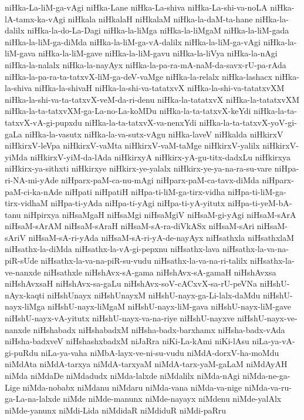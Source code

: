 {niHka-La-liM-ga-vAgi
niHka-Lane
niHka-La-shiva
niHka-La-shi-va-noLA
niHka-lA-tamx-ka-vAgi
niHkala
niHkalaH
niHkalaM
niHka-la-daM-ta-hane
niHka-la-dalilx
niHka-la-do-La-Dagi
niHka-la-liMga
niHka-la-liMgaM
niHka-la-liM-gada
niHka-la-liM-ga-diMda
niHka-la-liM-ga-vA-dalilx
niHka-la-liM-ga-vAgi
niHka-la-liM-gava
niHka-la-liM-gave
niHka-la-liM-gavu
niHka-la-liVya
niHka-la-nAgi
niHka-la-nalalx
niHka-la-nayAyx
niHka-la-pa-ra-mA-naM-da-savx-rU-pa-rAda
niHka-la-pa-ra-ta-tatxvX-liM-ga-deV-vaMge
niHka-la-relalx
niHka-lashacx
niHka-la-shiva
niHka-la-shivaH
niHka-la-shi-va-tatatxvX
niHka-la-shi-va-tatatxvXM
niHka-la-shi-va-ta-tatxvX-veM-da-ri-denu
niHka-la-tatatxvX
niHka-la-tatatxvXM
niHka-la-ta-tatxvXM-ga-La-no-La-koMDu
niHka-la-ta-tatxvX-keYdi
niHka-la-ta-tatxvX-vA-gi-pupxdu
niHka-la-ta-tatxvX-va-nenxYdi
niHka-la-ta-tatxvX-yoV-gi-gaLa
niHka-la-vasutx
niHka-la-va-sutx-vAgu
niHka-laveV
niHkalda
niHkirxV
niHkirxV-leVpa
niHkirxV-vaMta
niHkirxV-vaM-taMge
niHkirxV-yalilx
niHkirxV-yiMda
niHkirxV-yiM-da-lAda
niHkirxyA
niHkirx-yA-gu-titx-dadxLu
niHkirxya
niHkirx-ya-sithxti
niHkirxye
niHkirx-ye-yalalx
niHkirx-ye-ya-na-ra-su-vare
niHpa-ri-NA-mi-yAde
niHparx-paM-ca-nu-mAgi
niHparx-paM-ca-tavx-diMda
niHparx-paM-ci-ka-nAde
niHpati
niHpatiH
niHpa-ti-liM-ga-tirx-vidha
niHpa-ti-liM-ga-tirx-vidhaM
niHpa-ti-yAda
niHpa-ti-yAgi
niHpa-ti-yA-yitutx
niHpa-ti-yeM-bA-tanu
niHpirxya
niHsaMgaH
niHsaMgi
niHsaMgiV
niHsaM-gi-yAgi
niHsaM-sArA
niHsaM-sArAM
niHsaM-sAraH
niHsaM-sA-ra-diVkASx
niHsaM-sAri
niHsaM-sAriV
niHsaM-sA-ri-yAda
niHsaM-sA-ri-yA-de-nayAyx
niHsathxla
niHsathxlaM
niHsathx-la-diMda
niHsathx-la-vA-gi-pepxnu
niHsathx-lava
niHsathx-la-va-na-piR-sUde
niHsathx-la-va-na-piR-su-vudu
niHsathx-la-va-na-ri-talilx
niHsathx-la-ve-nanxde
niHsathxle
niHshAvx-sA-gama
niHshAvx-sA-gamaH
niHshAvxsa
niHshAvxsaH
niHshAvx-sa-gaLu
niHshAvx-soV-cACxvX-sa-rU-peVNa
niHshU-nAyx-kaqti
niHshUnayx
niHshUnayxM
niHshU-nayx-ga-Li-lalx-daMdu
niHshU-nayx-liMga
niHshU-nayx-liMgaM
niHshU-nayx-liM-gava
niHshU-nayx-liM-gave
niHshU-nayx-vA-yitutx
niHshU-nayx-va-na-riye
niHshU-nayxve
niHshU-nayx-ve-nanxde
niHshabadx
niHshabadxM
niHsha-badx-barxhamx
niHsha-badx-vAda
niHsha-badxveV
niHshashxbadxM
niJaRra
niKi-La-kAmi
niKi-lAsu
niLa-ya-vA-gi-puRdu
niLa-ya-vaha
niMbA-layx-ve-ni-su-vudu
niMdA-dorxV-ha-moMdu
niMdAta
niMdA-tarxya
niMdA-tarxyaM
niMdA-tarx-yaM-gaLaM
niMdAyAH
niMda
niMdaDe
niMdadudx
niMda-lalxde
niMdalilx
niMda-nAgi
niMda-ne-ga-Lige
niMda-nobabx
niMdanu
niMdaru
niMda-vana
niMda-va-nige
niMda-va-ru-ga-La-na-lalxde
niMde
niMde-manunx
niMde-nayayx
niMdenu
niMde-yalAlx
niMde-yanunx
niMdi-Lida
niMdidaR
niMdiduR
niMdi-paRru
}
